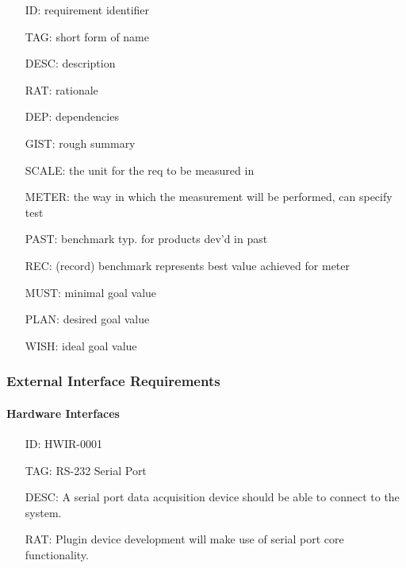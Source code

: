     \begin{itemize}
      \setlength{\itemindent}{.5in}
      \itemsep .15em
      \item[ID:] requirement identifier
      \item[TAG:] short form of name
      \item[DESC:] description
      \item[RAT:] rationale
      \item[DEP:] dependencies
      \item[GIST:] rough summary
      \item[SCALE:] the unit for the req to be measured in
      \item[METER:] the way in which the measurement will be performed, can specify test
      \item[PAST:] benchmark typ. for products dev'd in past
      \item[REC:] (record) benchmark represents best value achieved for meter
      \item[MUST:] minimal goal value
      \item[PLAN:] desired goal value
      \item[WISH:] ideal goal value
    \end{itemize}

    \subsubsection{External Interface Requirements}\label{sec:req-srs-ext}


      \paragraph{Hardware Interfaces}

        \begin{itemize}
          \setlength{\itemindent}{.5in}
          \itemsep .15em
          \item[ID:] HWIR-0001
          \item[TAG:] RS-232 Serial Port
          \item[DESC:] A serial port data acquisition device should be able
            to connect to the system.
          \item[RAT:] Plugin device development will make use of serial port
            core functionality.
        \end{itemize}

